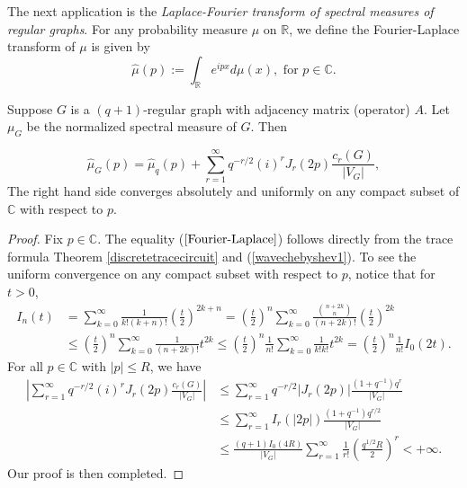 \documentclass{article}
\begin{document}
The next application is the \emph{Laplace-Fourier transform of spectral measures of regular graphs}. For any probability measure $\mu$ on $\mathbb{R}$, we define the Fourier-Laplace transform of $\mu$ is given by 
\[\hat{\mu}(p):=\int_{\mathbb{R}} e^{ipx}d\mu(x), \,\,\text{for}\,\,p\in \mathbb{C}.\] 

\begin{theorem}\label{thm:fourierlaplace}
   Suppose $G$ is a $(q+1)\text{-}$regular graph with adjacency matrix (operator) $A$. Let $\mu_G$ be the normalized spectral measure of $G$. Then 
   
    \begin{equation}\label{Fourier-Laplace}
     \hat{\mu}_G(p)=\hat{\mu}_q(p)+\sum_{r=1}^{\infty}q^{-r/2}(i)^rJ_r(2p)\frac{c_r(G)}{|V_G|},
    \end{equation}
 The right hand side converges absolutely and uniformly on any compact subset of $\mathbb{C}$ with respect to $p$.
\end{theorem}

\begin{proof}
    Fix $p\in \mathbb{C}$. The equality ($\ref{Fourier-Laplace}$) follows directly from the trace formula Theorem \ref{discretetracecircuit} and (\ref{wavechebyshev1}). To see the uniform convergence on any compact subset with respect to $p$, notice that for $t>0$, 
    \begin{equation*}
    \begin{aligned}
      I_{n}(t)&=\sum_{k=0}^{\infty} \frac{1}{k!(k+n)!}\left(\frac{t}{2}\right)^{2k+n}=\left(\frac{t}{2}\right)^n\sum_{k=0}^{\infty} \frac{\binom{n+2k}{n}}{(n+2k)!}\left(\frac{t}{2}\right)^{2k}  \\
      &\leq \left(\frac{t}{2}\right)^n\sum_{k=0}^{\infty} \frac{1}{(n+2k)!}t^{2k}\leq  \left(\frac{t}{2}\right)^n\frac{1}{n!}\sum_{k=0}^{\infty} \frac{1}{k!k!}t^{2k}=\left(\frac{t}{2}\right)^n\frac{1}{n!} I_0(2t).
    \end{aligned}
\end{equation*}
For all $p\in \mathbb{C}$ with $|p|\leq R$, we have
$$
\begin{aligned}
\left|\sum_{r=1}^{\infty}q^{-r/2}(i)^rJ_r(2p)\frac{c_r(G)}{|V_G|}\right|
&\leq\sum_{r=1}^{\infty}q^{-r/2}|J_r(2p)|\frac{(1+q^{-1})q^{r}}{|V_G|}\\
&\leq\sum_{r=1}^{\infty}I_r(|2p|)\frac{(1+q^{-1})q^{r/2}}{|V_G|}\\
&\leq \frac{(q+1)I_0(4R)}{|V_G|} \sum_{r=1}^{\infty}\frac{1}{r!}\left(\frac{q^{1/2}R}{2}\right)^r<+\infty.
\end{aligned}
$$
Our proof is then completed.
\end{proof}
\end{document}
